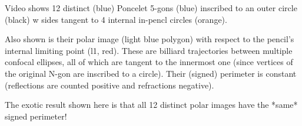 Video shows 12 distinct (blue) Poncelet 5-gons (blue) inscribed to an outer circle (black) w sides tangent to 4 internal in-pencl circles (orange).

Also shown is their polar image (light blue polygon) with respect to the pencil's internal limiting point (l1, red). These are billiard trajectories between multiple confocal ellipses, all of which are tangent to the innermost one (since vertices of the original N-gon are inscribed to a circle). Their (signed) perimeter is constant (reflections are counted positive and refractions negative).

The exotic result shown here is that all 12 distinct polar images have the *same* signed perimeter!
